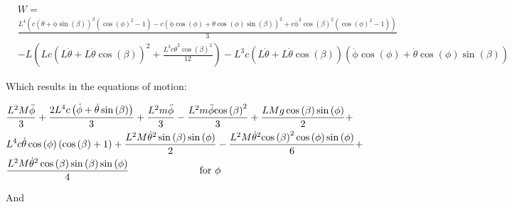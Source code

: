 \begin{equation}
    \begin{split}
        &W = \\
        &\frac{L^4\left(c{\left(\dot\theta+\mathrm{\dot\phi}\sin\left(\beta \right)\right)}^2\left({\cos\left(\phi \right)}^2-1\right)-c{\left(\mathrm{\dot\phi}\cos\left(\phi \right)+\dot\theta\cos\left(\phi \right)\sin\left(\beta \right)\right)}^2+c{\mathrm{\dot\phi}}^2{\cos\left(\beta \right)}^2\left({\cos\left(\phi \right)}^2-1\right)\right)}{3}\\
        &-L\left(Lc{\left(L\dot\theta+L\dot\theta\cos\left(\beta \right)\right)}^2+\frac{L^3c{\dot\theta}^2{\cos\left(\beta \right)}^2}{12}\right)-L^3c\left(L\dot\theta+L\dot\theta\cos\left(\beta \right)\right)\left(\mathrm{\dot\phi}\cos\left(\phi \right)+\dot\theta\cos\left(\phi \right)\sin\left(\beta \right)\right)
    \end{split}
\end{equation}

Which results in the equations of motion:

\begin{equation}
    \begin{split}
        &\frac{L^2M\mathrm{\ddot\phi}}{3}+\frac{2L^4c\left(\mathrm{\dot\phi}+\dot\theta\sin\left(\beta \right)\right)}{3}+\frac{L^2m\mathrm{\ddot\phi}}{3}-\frac{L^2m\mathrm{\ddot\phi}{\cos\left(\beta \right)}^2}{3}+\frac{LMg\cos\left(\beta \right)\sin\left(\phi \right)}{2}+\\
        &L^4c\dot\theta\cos\left(\phi \right)\left(\cos\left(\beta \right)+1\right)+\frac{L^2M{\dot\theta}^2\sin\left(\beta \right)\sin\left(\phi \right)}{2}-\frac{L^2M{\dot\theta}^2{\cos\left(\beta \right)}^2\cos\left(\phi \right)\sin\left(\phi \right)}{6}+\\
        &\frac{L^2M{\dot\theta}^2\cos\left(\beta \right)\sin\left(\beta \right)\sin\left(\phi \right)}{4}\hspace{25mm} \text{for } \phi
    \end{split}
\end{equation}

And 


